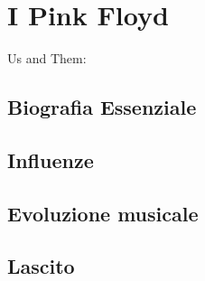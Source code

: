 \documentclass[class=book, crop=false, oneside, 12pt]{standalone}
\begin{document}
    \chapter{I Pink Floyd}
    Us and Them:     
    \section{Biografia Essenziale}
    \section{Influenze}
    \section{Evoluzione musicale}
    \section{Lascito}
\end{document}
